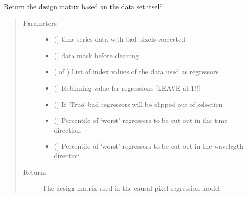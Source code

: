 \documentclass[a4paper,10pt,english]{sphinxmanual}
\begin{document}
\begin{fulllineitems}
\begin{fulllineitems}
\label{\detokenize{cascade.TSO:cascade.TSO.TSO.TSOSuite.get_design_matrix}}
Return the design matrix based on the data set itself
\begin{quote}\begin{description}
\item[{Parameters}] \leavevmode\begin{itemize}
\item {} 
 () \textendash{} time series data with bad pixels corrected

\item {} 
 () \textendash{} data mask before cleaning

\item {} 
 ( of ) \textendash{} List of index values of the data used as regressors

\item {} 
 () \textendash{} Rebinning value for regressions {[}LEAVE at 1!!{]}

\item {} 
 () \textendash{} If ‘True{}` bad regressors will be clipped out of selection

\item {} 
 () \textendash{} Percentile of ‘worst’ regressors to be cut out in the
time direction.

\item {} 
 () \textendash{} Percentile of ‘worst’ regressors to be cut out in the
wavelegth direction.

\end{itemize}

\item[{Returns}] \leavevmode
{} \textendash{} The design matrix used in the causal pixel regression model


\end{description}
\end{quote}
\end{fulllineitems}
\end{fulllineitems}
\end{document}
